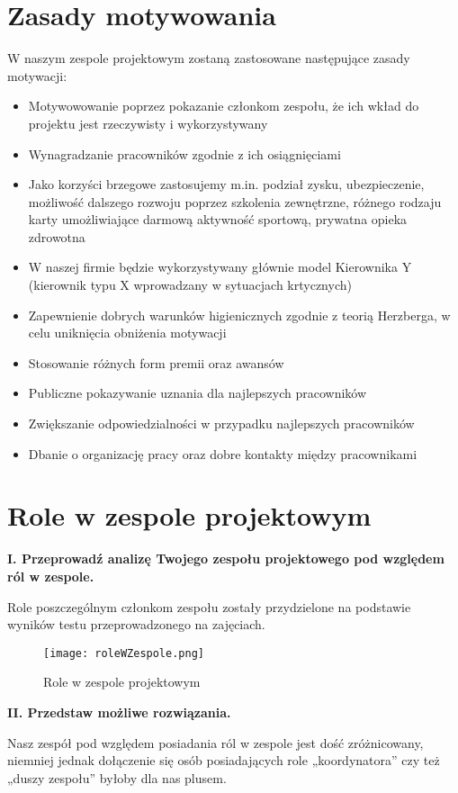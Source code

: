 
\section{Zasady motywowania}

W naszym zespole projektowym zostaną zastosowane następujące zasady motywacji:
\begin{itemize}
\item Motywowowanie poprzez pokazanie członkom zespołu, że ich wkład do projektu jest rzeczywisty i wykorzystywany
\item Wynagradzanie pracowników zgodnie z ich osiągnięciami
\item Jako korzyści brzegowe zastosujemy m.in. podział zysku, ubezpieczenie, możliwość dalszego rozwoju poprzez szkolenia zewnętrzne, różnego rodzaju karty umożliwiające darmową aktywność sportową, prywatna opieka zdrowotna
\item W naszej firmie będzie wykorzystywany głównie model Kierownika Y (kierownik typu X wprowadzany w sytuacjach krtycznych)
\item Zapewnienie dobrych warunków higienicznych zgodnie z teorią Herzberga, w celu uniknięcia obniżenia motywacji
\item Stosowanie różnych form premii oraz awansów
\item Publiczne pokazywanie uznania dla najlepszych pracowników
\item Zwiększanie odpowiedzialności w przypadku najlepszych pracowników
\item Dbanie o organizację pracy oraz dobre kontakty między pracownikami
\end{itemize}



\section{Role w zespole projektowym}

\textbf{I. Przeprowadź analizę Twojego zespołu projektowego pod względem ról w zespole.}

Role poszczególnym członkom zespołu zostały przydzielone na podstawie wyników testu przeprowadzonego na zajęciach.

\begin{figure}[!h]
\centering
\texttt{[image: roleWZespole.png]}
\caption{Role w zespole projektowym}
\label{fig:roleWZespole}
\end{figure}

\textbf{II. Przedstaw możliwe rozwiązania.}

Nasz zespół pod względem posiadania ról w zespole jest dość zróżnicowany, niemniej jednak dołączenie się osób posiadających role „koordynatora” czy też „duszy zespołu” byłoby dla nas plusem.



